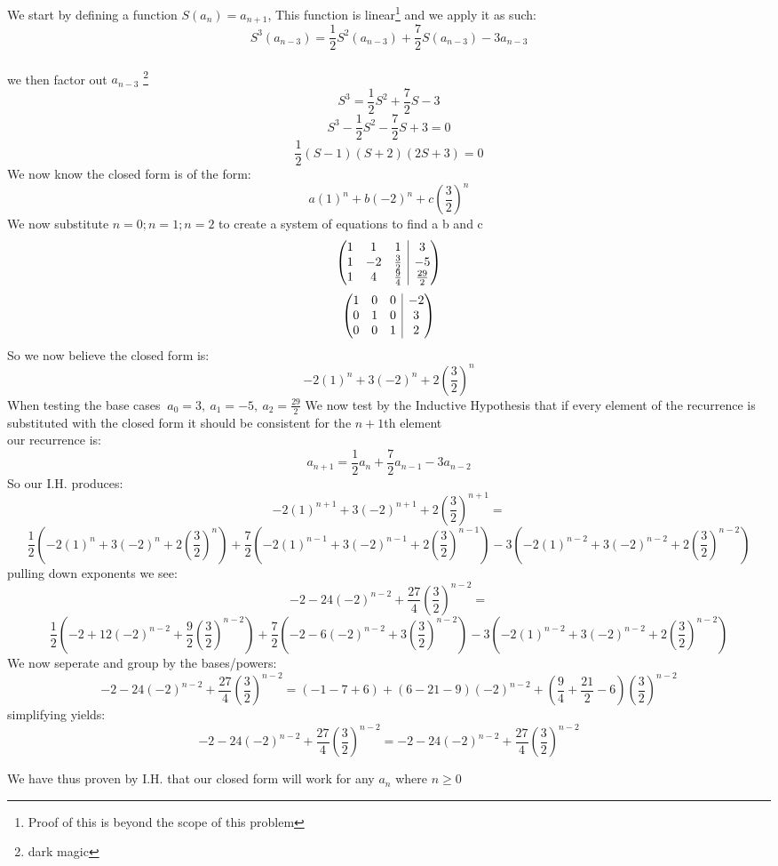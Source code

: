 \documentclass{article}
\makeatletter
\newcounter{prob}\setcounter{prob}{1}\newcommand{\prob}{\arabic{prob}.\indent \addtocounter{prob}{1}}
\newenvironment{amatrix}[1]{%
	\left(\begin{array}{@{}*{#1}{c}|c@{}}
	}{%
\end{array}\right)
}
\makeatother
\begin{document}
We start by defining a function $S(a_n) =a_{n+1}$, This function is linear\footnote{Proof of this is beyond the scope of this problem} and we apply it as such:
$$S^3(a_{n-3})= \frac{1}{2}S^2(a_{n-3})+\frac{7}{2}S(a_{n-3})-3a_{n-3}$$\\
we then factor out $a_{n-3}$ \footnote{dark magic}
$$S^3= \frac{1}{2}S^2+\frac{7}{2}S-3$$
$$S^3 -\frac{1}{2}S^2-\frac{7}{2}S+3=0$$
$$\frac{1}{2}(S-1)(S+2)(2S+3)=0$$
We now know the closed form is of the form:
$$a(1)^n+b(-2)^n+c(\frac{3}{2})^n$$
We now substitute $n=0;n=1;n=2$ to create a system of equations to find a b and c
$$\begin{amatrix}{3}
	1 & 1 & 1 & 3 \\  1 & -2 & \frac{3}{2} & -5 \\ 1 & 4 & \frac{9}{4} & \frac{29}{2} 
\end{amatrix}$$
$$\begin{amatrix}{3}
1 & 0 & 0 & -2 \\  0 & 1 & 0 & 3 \\ 0 & 0 & 1 & 2 
\end{amatrix}$$
So we now believe the closed form is:
$$-2(1)^n+3(-2)^n+2(\frac{3}{2})^n$$
When testing the base cases $\ a_0=3,\ a_1=-5,\ a_2=\frac{29}{2}$
We now test by the Inductive Hypothesis that if every element of the recurrence is substituted with the closed form it should be consistent for the $n+1$th element\\
our recurrence is:
$$a_{n+1}= \frac{1}{2}a_{n}+\frac{7}{2}a_{n-1}-3a_{n-2}$$
So our I.H. produces:
$$-2(1)^{n+1}+3(-2)^{n+1}+2(\frac{3}{2})^{n+1}=$$$$ \frac{1}{2}(-2(1)^{n}+3(-2)^{n}+2(\frac{3}{2})^{n})+\frac{7}{2}(-2(1)^{n-1}+3(-2)^{n-1}+2(\frac{3}{2})^{n-1})-3(-2(1)^{n-2}+3(-2)^{n-2}+2(\frac{3}{2})^{n-2})$$
pulling down exponents we see:
$$-2-24(-2)^{n-2}+\frac{27}{4}(\frac{3}{2})^{n-2}=$$$$ \frac{1}{2}(-2+12(-2)^{n-2}+\frac{9}{2}(\frac{3}{2})^{n-2})+\frac{7}{2}(-2-6(-2)^{n-2}+3(\frac{3}{2})^{n-2})-3(-2(1)^{n-2}+3(-2)^{n-2}+2(\frac{3}{2})^{n-2})$$
We now seperate and group by the bases/powers:
$$-2-24(-2)^{n-2}+\frac{27}{4}(\frac{3}{2})^{n-2}=(-1-7+6) +(6-21-9)(-2)^{n-2}+(\frac{9}{4}+\frac{21}{2}-6)(\frac{3}{2})^{n-2}$$
simplifying yields: 
$$-2-24(-2)^{n-2}+\frac{27}{4}(\frac{3}{2})^{n-2}=-2 -24(-2)^{n-2} +\frac{27}{4}(\frac{3}{2})^{n-2}$$

We have thus proven by I.H. that our closed form will work for any $a_n$ where $n\geq0$\\
\end{document}
